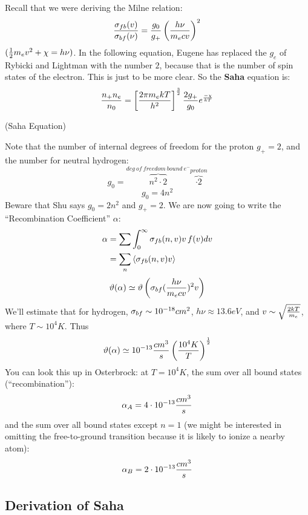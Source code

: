 \documentclass[11pt]{article}
\def\hf{{1 \over 2}}
\def\mean#1{\left\langle #1\right\rangle}
\def\e#1{\cdot10^{#1}}
\begin{document}
Recall that we were deriving the Milne relation:
$${\sigma_{fb}(v)\over\sigma_{bf}(\nu)}={g_0\over g_+}\left({h\nu\over m_ecv}\right)^2$$
$(\hf m_ev^2+\chi=h\nu)$.  In the following equation, Eugene has replaced
the $g_e$ of Rybicki and Lightman with the number $2$, because that is the
number of spin states of the electron.  This is just to be more clear.  So
the {\bf Saha} equation is:
$${n_+n_e\over n_0}=\left[{2\pi m_ekT\over h^2}\right]^{3\over2}{2g_+\over
g_0}e^{-\chi\over kT}$$
\centerline{(Saha Equation)}
Note that the number of internal degrees of freedom for the proton $g_+=2$, and
the number for neutral hydrogen:
$$g_0=\overbrace{n^2\cdot2}^{deg\ of\ freedom\ bound\ e^-}\overbrace{\cdot2}
^{proton}$$
$$g_0=4n^2$$
Beware that Shu says $g_0=2n^2$ and $g_+=2$.  We are now going to write the
``Recombination Coefficient'' $\alpha$:
$$\begin{aligned}\alpha&=\sum{\int_0^\infty{\sigfb(n,v)v\,f(v)dv}}\\ 
&=\sum_n{\mean{\sigfb(n,v)v}}\\ \end{aligned}$$
$$\vartheta(\alpha)\simeq\vartheta\left(\sigma_{bf}({h\nu\over m_ecv})^2v\right)$$
We'll estimate that for hydrogen, $\sigma_{bf}\sim10^{-18} cm^2$, $h\nu\approx
13.6eV$, and $v\sim\sqrt{2kT\over m_e}$, where $T\sim10^4K$.  Thus
$$\vartheta(\alpha)\simeq10^{-13}{cm^3\over s}\left({10^4K\over T}\right)^\hf$$
You can look this up in Osterbrock: at $T=10^4K$, the sum over all bound
states (``recombination''):
$$\alpha_A=4\e{-13}{cm^3\over s}$$
and the sum over all bound states except $n=1$ (we might be interested in
omitting the free-to-ground transition because it is likely to ionize
a nearby atom):
$$\alpha_B=2\e{-13}{cm^3\over s}$$

\subsection*{ Derivation of Saha}
\end{document}
